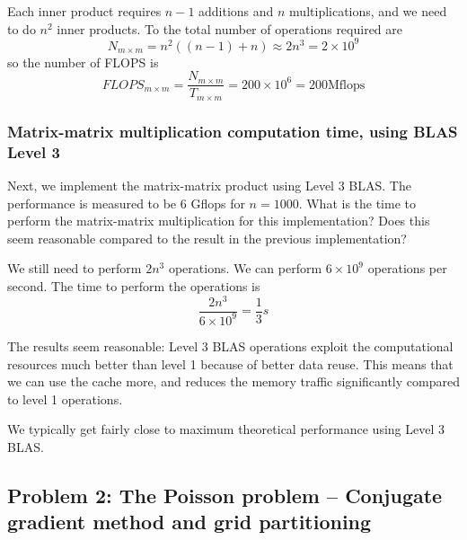 Each inner product requires $n-1$ additions and $n$ multiplications, and we need to do $n^2$ inner products. To the total number of operations required are
\begin{equation}
  N_{m\times m} = n^2((n-1)+n) \approx 2n^3 = 2 \times 10^9
\end{equation}
so the number of FLOPS is
\begin{equation}
  FLOPS_{m\times m} = \frac{N_{m\times m}}{T_{m\times m}} = 200\times 10^6 = 200 \mathrm{Mflops}
\end{equation}



\subsubsection{Matrix-matrix multiplication computation time, using BLAS Level 3} %
\label{ssub:matrix_matrix_multiplication_computation_time_using_blas_level_3}

\begin{question}
  Next, we implement the matrix-matrix product using Level 3 BLAS. The performance is measured to be 6 Gflops for $n=1000$. What is the time to perform the matrix-matrix multiplication for this implementation? Does this seem reasonable compared to the result in the previous implementation?
\end{question}

We still need to perform $2n^3$ operations. We can perform $6\times 10^9$ operations per second. The time to perform the operations is
\begin{equation}
  \frac{2n^3}{6\times 10^9} = \frac{1}{3} s
\end{equation}

The results seem reasonable: Level 3 BLAS operations exploit the computational resources much better than level 1 because of better data reuse. This means that we can use the cache more, and reduces the memory traffic significantly compared to level 1 operations.

We typically get fairly close to maximum theoretical performance using Level 3 BLAS.





\subsection{Problem 2: The Poisson problem -- Conjugate gradient method and grid partitioning} %
\label{sub:problem_2}

